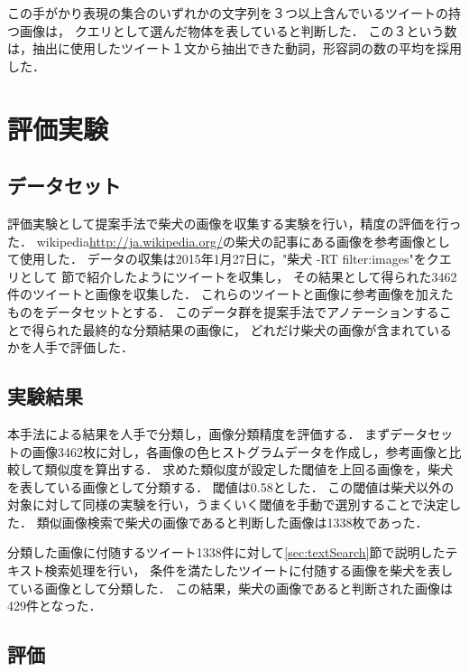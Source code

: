 この手がかり表現の集合のいずれかの文字列を３つ以上含んでいるツイートの持つ画像は，
クエリとして選んだ物体を表していると判断した．
この３という数は，抽出に使用したツイート１文から抽出できた動詞，形容詞の数の平均を採用した．

\chapter{評価実験}
\label{sec:experiment}
\section{データセット}

評価実験として提案手法で柴犬の画像を収集する実験を行い，精度の評価を行った．
wikipedia\url{http://ja.wikipedia.org/}の柴犬の記事にある画像を参考画像として使用した．
データの収集は2015年1月27日に，"柴犬 -RT filter:images"をクエリとして
\label{sec:tweetCollect}節で紹介したようにツイートを収集し，
その結果として得られた3462件のツイートと画像を収集した．
これらのツイートと画像に参考画像を加えたものをデータセットとする．
このデータ群を提案手法でアノテーションすることで得られた最終的な分類結果の画像に，
どれだけ柴犬の画像が含まれているかを人手で評価した．

\section{実験結果}
\label{sec:expresult}

本手法による結果を人手で分類し，画像分類精度を評価する．
まずデータセットの画像3462枚に対し，各画像の色ヒストグラムデータを作成し，参考画像と比較して類似度を算出する．
求めた類似度が設定した閾値を上回る画像を，柴犬を表している画像として分類する．
閾値は0.58とした．
この閾値は柴犬以外の対象に対して同様の実験を行い，うまくいく閾値を手動で選別することで決定した．
類似画像検索で柴犬の画像であると判断した画像は1338枚であった．

分類した画像に付随するツイート1338件に対して\ref{sec:textSearch}節で説明したテキスト検索処理を行い，
条件を満たしたツイートに付随する画像を柴犬を表している画像として分類した．
この結果，柴犬の画像であると判断された画像は429件となった．

\section{評価}

